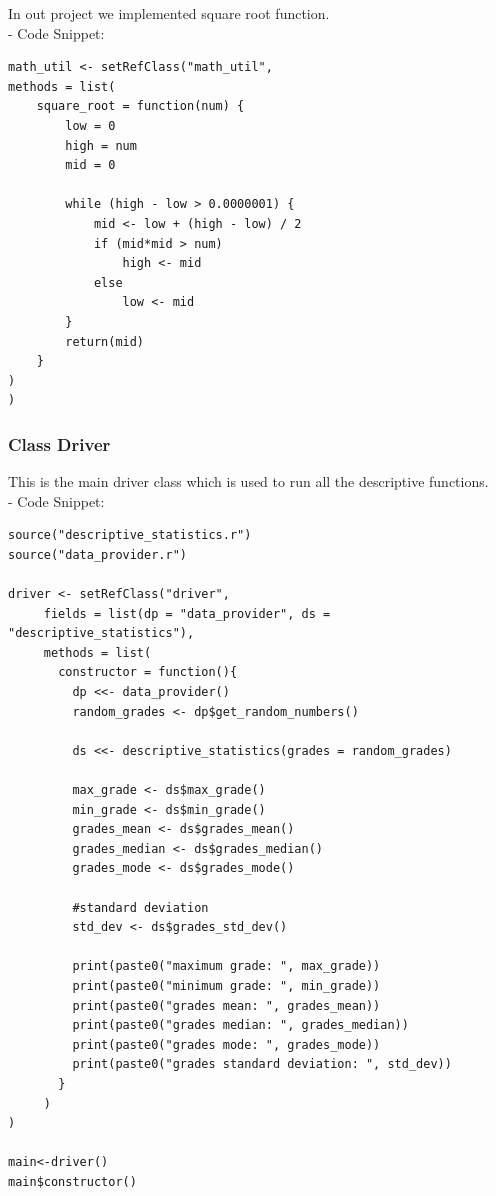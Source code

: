 \documentclass[11pt]{article}
\begin{document}
In out project we implemented square root function.\\

- Code Snippet:\\

\begin{lstlisting}
math_util <- setRefClass("math_util",
methods = list(
    square_root = function(num) {
        low = 0
        high = num
        mid = 0

        while (high - low > 0.0000001) {
            mid <- low + (high - low) / 2
            if (mid*mid > num)
                high <- mid
            else
                low <- mid
        }    
        return(mid)
    }
)
)
\end{lstlisting}

\subsubsection{Class Driver}
This is the main driver class which is used to run all the descriptive functions.\\

- Code Snippet:\\

\begin{lstlisting}
source("descriptive_statistics.r")
source("data_provider.r")

driver <- setRefClass("driver",
     fields = list(dp = "data_provider", ds = "descriptive_statistics"),
     methods = list(
       constructor = function(){
         dp <<- data_provider()
         random_grades <- dp$get_random_numbers()
         
         ds <<- descriptive_statistics(grades = random_grades)
         
         max_grade <- ds$max_grade()
         min_grade <- ds$min_grade()
         grades_mean <- ds$grades_mean()
         grades_median <- ds$grades_median()
         grades_mode <- ds$grades_mode()
         
         #standard deviation
         std_dev <- ds$grades_std_dev()
         
         print(paste0("maximum grade: ", max_grade))
         print(paste0("minimum grade: ", min_grade))
         print(paste0("grades mean: ", grades_mean))
         print(paste0("grades median: ", grades_median))
         print(paste0("grades mode: ", grades_mode))
         print(paste0("grades standard deviation: ", std_dev))
       }
     )
)

main<-driver()
main$constructor()
\end{lstlisting}
\end{document}
